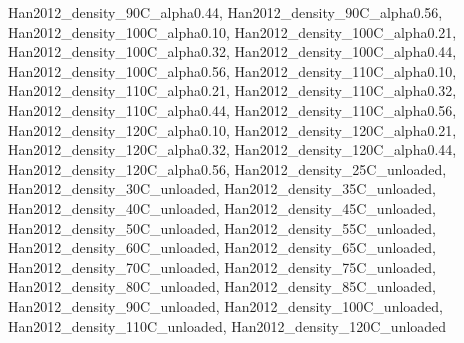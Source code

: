 Han2012_density_90C_alpha0.44, Han2012_density_90C_alpha0.56, Han2012_density_100C_alpha0.10, Han2012_density_100C_alpha0.21, Han2012_density_100C_alpha0.32, Han2012_density_100C_alpha0.44, Han2012_density_100C_alpha0.56, Han2012_density_110C_alpha0.10, Han2012_density_110C_alpha0.21, Han2012_density_110C_alpha0.32, Han2012_density_110C_alpha0.44, Han2012_density_110C_alpha0.56, Han2012_density_120C_alpha0.10, Han2012_density_120C_alpha0.21, Han2012_density_120C_alpha0.32, Han2012_density_120C_alpha0.44, Han2012_density_120C_alpha0.56, Han2012_density_25C_unloaded, Han2012_density_30C_unloaded, Han2012_density_35C_unloaded, Han2012_density_40C_unloaded, Han2012_density_45C_unloaded, Han2012_density_50C_unloaded, Han2012_density_55C_unloaded, Han2012_density_60C_unloaded, Han2012_density_65C_unloaded, Han2012_density_70C_unloaded, Han2012_density_75C_unloaded, Han2012_density_80C_unloaded, Han2012_density_85C_unloaded, Han2012_density_90C_unloaded, Han2012_density_100C_unloaded, Han2012_density_110C_unloaded, Han2012_density_120C_unloaded
